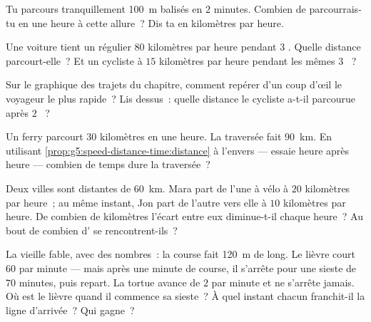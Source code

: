 \begin{exercise}[$\star$]\label{exo:g5:speed-distance-time:6}
Tu parcours tranquillement \qty{100}{m} balisés en $2$ minutes.
Combien de  parcourrais-tu en une heure à cette allure~? Dis ta
 en kilomètres par heure.
\end{exercise}

\begin{exercise}[$\star$]\label{exo:g5:speed-distance-time:7}
Une voiture tient un régulier $80$ kilomètres par heure pendant $3$
. Quelle distance parcourt-elle~? Et un cycliste à $15$
kilomètres par heure pendant les mêmes $3$ ~?
\end{exercise}

\begin{exercise}[$\star$]\label{exo:g5:speed-distance-time:8}
Sur le graphique des trajets du chapitre, comment repérer d'un coup
d'œil le voyageur le plus rapide~? Lis dessus~: quelle distance le
cycliste a-t-il parcourue après $2$ ~?
\end{exercise}

\begin{exercise}[$\star\star$]\label{exo:g5:speed-distance-time:9}
Un ferry parcourt $30$ kilomètres en une heure. La traversée fait
\qty{90}{km}. En utilisant
\cref{prop:g5:speed-distance-time:distance} à l'envers --- essaie
heure après heure --- combien de temps dure la traversée~?
\end{exercise}

\begin{exercise}[$\star\star$]\label{exo:g5:speed-distance-time:10}
Deux villes sont distantes de \qty{60}{km}. Mara part de l'une à vélo
à $20$ kilomètres par heure~; au même instant, Jon part de l'autre
vers elle à $10$ kilomètres par heure. De combien de kilomètres
l'écart entre eux diminue-t-il chaque heure~? Au bout de combien
d' se rencontrent-ils~?
\end{exercise}

\begin{exercise}[$\star\star$]\label{exo:g5:speed-distance-time:11}
La vieille fable, avec des nombres~: la course fait \qty{120}{m} de
long. Le lièvre court $60$  par minute --- mais après une
minute de course, il s'arrête pour une sieste de $70$ minutes, puis
repart. La tortue avance de $2$  par minute et ne s'arrête
jamais. Où est le lièvre quand il commence sa sieste~? À quel instant
chacun franchit-il la ligne d'arrivée~? Qui gagne~?
\end{exercise}
